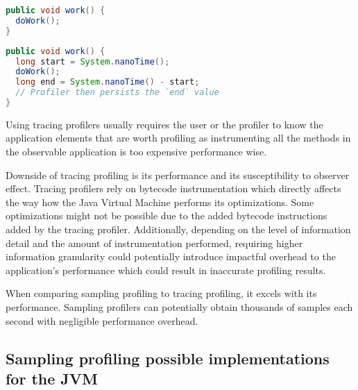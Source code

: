 \documentclass[..thesis.tex]{subfiles}
\begin{document}
\begin{minipage}[b]{.45\textwidth}
\begin{lstlisting}[language=java,style=def,label={lst:uninstrumented}, caption={Original source}]
public void work() {
  doWork();
}
\end{lstlisting}
\end{minipage}\hspace{12mm}
\begin{minipage}[b]{.45\textwidth}
\begin{lstlisting}[language=java,style=def,label={lst:instrumented}, caption={Instrumented source}]
public void work() {
  long start = System.nanoTime();
  doWork();
  long end = System.nanoTime() - start;
  // Profiler then persists the `end` value
}
\end{lstlisting}
\end{minipage}



Using tracing profilers usually requires the user or the profiler to know the application elements that are worth profiling as instrumenting all the methods in the observable application is too expensive performance wise. 

Downside of tracing profiling is its performance and its susceptibility to observer effect. Tracing profilers rely on bytecode instrumentation which directly affects the way how the Java Virtual Machine performs its optimizations. Some optimizations might not be possible due to the added bytecode instructions added by the tracing profiler. Additionally, depending on the level of information detail and the amount of instrumentation performed, requiring higher information granularity could potentially introduce impactful overhead to the application's performance which could result in inaccurate profiling results. 

When comparing sampling profiling to tracing profiling, it excels with its performance. Sampling profilers can potentially obtain thousands of samples each second with negligible performance overhead.

\subsection{Sampling profiling possible implementations for the JVM}
\end{document}

